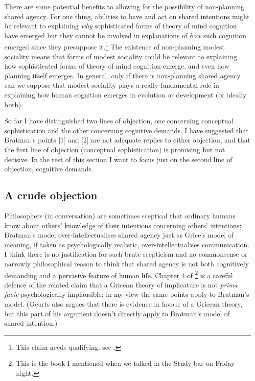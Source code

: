 \documentclass[12pt,letterpaper]{extarticle}
\begin{document}
There are some potential benefits to allowing for the possibility of non-planning shared agency.
For one thing, abilities to  have and act on shared intentions might be relevant to explaining \emph{why} sophisticated forms of theory of mind cognition have emerged but they cannot be involved in explanations of \emph{how} such cognition emerged since they presuppose it.\footnote{
This claim needs qualifying; see \citet{Butterfill:2011fk}.
}
The existence of non-planning modest sociality means that forms of modest sociality could be relevant to explaining how sophisticated forms of theory of mind cognition emerge, and even how planning itself emerges.
In general, only if there is non-planning shared agency can we suppose that modest sociality plays a really fundamental role in explaining how human cognition emerges in evolution or development (or ideally both).  


So far I have distinguished two lines of objection, one concerning conceptual sophistication and the other concerning cognitive demands.
I have suggested that Bratman's points [1] and [2] are not adequate replies to either objection, and that the first line of objection (conceptual sophistication) is promising but not decisive.  
In the rest of this section I want to focus just on the second line of objection, cognitive demands.



\subsection{A crude objection}
Philosophers (in conversation) are sometimes sceptical that ordinary humans know about others' knowledge of their intentions concerning others' intentions; Bratman's model over-intellectualises shared agency just as Grice's model of meaning, if taken as psychologically realistic, over-intellectualises communication.
I think there is no justification for such brute scepticism and no commonsense or narrowly philosophical reason to think that shared agency is not both cognitively demanding and a pervasive feature of human life.
Chapter 4 of \citet{geurts_quantity_2011}\footnote{This is the book I mentioned when we talked in the Study bar on Friday night.}
is a careful defence of the related claim that a Gricean theory of implicature is not \emph{prima facie} psychologically implausible;  in my view the same points apply to Bratman's model.
(Geurts also argues that there is evidence in favour of a Gricean theory, but this part of his argument doesn't directly apply to Bratman's model of shared intention.)
\end{document}
